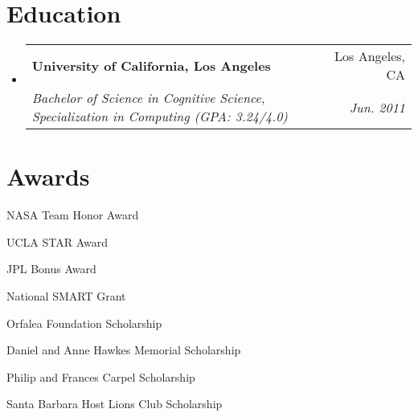 \documentclass[letterpaper,11pt]{article}
\makeatletter
\newcommand{\resumeSubheading}[4]{
  \vspace{-2pt}\item
    \begin{tabular*}{0.97\textwidth}[t]{l@{\extracolsep{\fill}}r}
      \textbf{#1} & #2 \\
      \textit{\small#3} & \textit{\small #4} \\
    \end{tabular*}\vspace{-7pt}
}
\newcommand{\resumeSubHeadingListStart}{\begin{itemize}[leftmargin=0.15in, label={}]}
\newcommand{\resumeSubHeadingListEnd}{\end{itemize}}
\makeatother
\begin{document}
    \section{Education}
    \resumeSubHeadingListStart
      \resumeSubheading
        {University of California, Los Angeles}{Los Angeles, CA}
        {Bachelor of Science in Cognitive Science, Specialization in Computing (GPA: 3.24/4.0)}{Jun. 2011}
    \resumeSubHeadingListEnd

    \section{Awards}
    \vspace*{-1.4\multicolsep}
    \begin{multicols}{2}
      \begin{itemize}
        \setlength{\parskip}{0pt}
        \setlength{\itemsep}{0pt plus 1pt}
        \small{
          \item{NASA Team Honor Award}
          \item{UCLA STAR Award}
          \item{JPL Bonus Award}
          \item{National SMART Grant}
          \item{Orfalea Foundation Scholarship}
          \item{Daniel and Anne Hawkes Memorial Scholarship}
          \item{Philip and Frances Carpel Scholarship}
          \item{Santa Barbara Host Lions Club Scholarship}
        }
      \end{itemize}
    \end{multicols}
\end{document}
